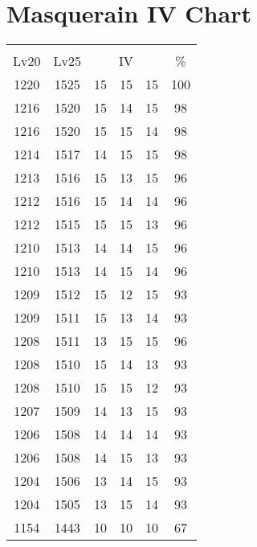 \documentclass{article}%
\begin{document}
%
\normalsize%
\section{Masquerain IV Chart}%
\label{sec:Masquerain IV Chart}%
\renewcommand{\arraystretch}{1.5}%
\begin{tabular}{|c|c|c|c|c|c|}%
\hline%
\multicolumn{6}{|c|}{\textcolor{white}{ 
\linebreak{Masquerain}
}%
\cellcolor{black}}\\%
\multicolumn{1}{|c}{Lv20}&\multicolumn{1}{c|}{Lv25}&\multicolumn{3}{c|}{IV}&\multicolumn{1}{|c|}{\%}\\%
\hline%
\rowcolor{color100}%
1220&1525&15&15&15&100\\%
\hline%
\rowcolor{color98}%
1216&1520&15&14&15&98\\%
\hline%
\rowcolor{color98}%
1216&1520&15&15&14&98\\%
\hline%
\rowcolor{color98}%
1214&1517&14&15&15&98\\%
\hline%
\rowcolor{color96}%
1213&1516&15&13&15&96\\%
\hline%
\rowcolor{color96}%
1212&1516&15&14&14&96\\%
\hline%
\rowcolor{color96}%
1212&1515&15&15&13&96\\%
\hline%
\rowcolor{color96}%
1210&1513&14&14&15&96\\%
\hline%
\rowcolor{color96}%
1210&1513&14&15&14&96\\%
\hline%
\rowcolor{color93}%
1209&1512&15&12&15&93\\%
\hline%
\rowcolor{color93}%
1209&1511&15&13&14&93\\%
\hline%
\rowcolor{color96}%
1208&1511&13&15&15&96\\%
\hline%
\rowcolor{color93}%
1208&1510&15&14&13&93\\%
\hline%
\rowcolor{color93}%
1208&1510&15&15&12&93\\%
\hline%
\rowcolor{color93}%
1207&1509&14&13&15&93\\%
\hline%
\rowcolor{color93}%
1206&1508&14&14&14&93\\%
\hline%
\rowcolor{color93}%
1206&1508&14&15&13&93\\%
\hline%
\rowcolor{color93}%
1204&1506&13&14&15&93\\%
\hline%
\rowcolor{color93}%
1204&1505&13&15&14&93\\%
\hline%
\rowcolor{color91}%
1154&1443&10&10&10&67\\%
\end{tabular}

%
\end{document}
